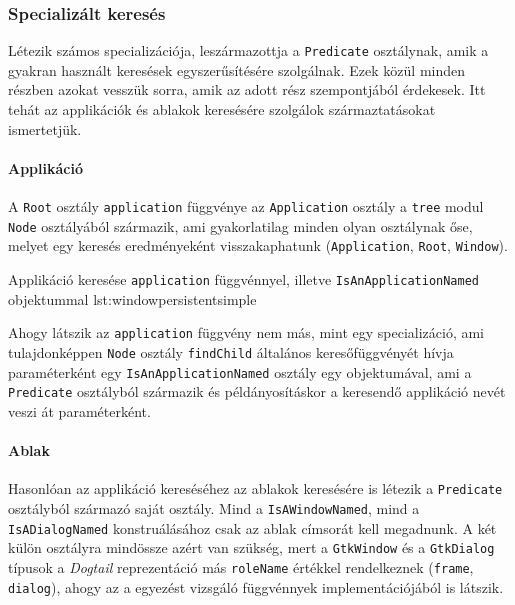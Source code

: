 \subsubsection{Specializált keresés}

Létezik számos specializációja, leszármazottja a \texttt{Predicate} osztálynak, amik a gyakran használt keresések egyszerűsítésére szolgálnak. Ezek közül minden részben azokat vesszük sorra, amik az adott rész szempontjából érdekesek. Itt tehát az applikációk és ablakok keresésére szolgálok származtatásokat ismertetjük.

\paragraph{Applikáció}

A \texttt{Root} osztály \texttt{application} függvénye az \texttt{Application} osztály a \texttt{tree} modul \texttt{Node} osztályából származik, ami gyakorlatilag minden olyan osztálynak őse, melyet egy keresés eredményeként visszakaphatunk (\texttt{Application}, \texttt{Root}, \texttt{Window}).

{Applikáció keresése \texttt{application} függvénnyel, illetve \texttt{IsAnApplicationNamed} objektummal}
{lst:windowpersistentsimple}

Ahogy látszik az \texttt{application} függvény nem más, mint egy specializáció, ami tulajdonképpen \texttt{Node} osztály \texttt{findChild} általános keresőfüggvényét hívja paraméterként egy \texttt{IsAnApplicationNamed} osztály egy objektumával, ami a \texttt{Predicate} osztályból származik és példányosításkor a keresendő applikáció nevét veszi át paraméterként.

\paragraph{Ablak}

Hasonlóan az applikáció kereséséhez az ablakok keresésére is létezik a \texttt{Predicate} osztályból származó saját osztály. Mind a \texttt{IsAWindowNamed}, mind a \texttt{IsADialogNamed} konstruálásához csak az ablak címsorát kell megadnunk. A két külön osztályra mindössze azért van szükség, mert a \texttt{GtkWindow} és a \texttt{GtkDialog} típusok a \textit{Dogtail} reprezentáció más \texttt{roleName} értékkel rendelkeznek (\texttt{frame}, \texttt{dialog}), ahogy az a egyezést vizsgáló függvénnyek implementációjából is látszik.

